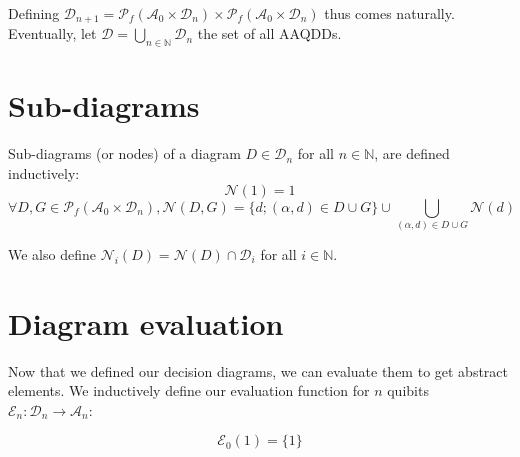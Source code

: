 \begin{center}
\end{center}

Defining $\mathcal{D}_{n+1} = \mathscr{P}_f(\mathcal{A}_0 \times \mathcal{D}_n) \times \mathscr{P}_f(\mathcal{A}_0 \times \mathcal{D}_n)$ thus comes naturally. Eventually, let $\mathcal{D} = \bigcup_{n \in \mathbb{N}} \mathcal{D}_n$ the set of all AAQDDs.

\section{Sub-diagrams}

Sub-diagrams (or nodes) of a diagram $D \in \mathcal{D}_n$ for all $n \in \mathbb{N}$, are defined inductively:
$$\mathcal{N}(\boxed{1}) = \boxed{1}$$
$$\forall D, G \in \mathscr{P}_f(\mathcal{A}_0 \times \mathcal{D}_n), \mathcal{N}(D, G) = \{d ; (\alpha, d) \in D \cup G\} \cup
\bigcup_{(\alpha, d) \in D \cup G} \mathcal{N}(d)$$

We also define $\mathcal{N}_i(D) = \mathcal{N}(D) \cap \mathcal{D}_i$ for all $i \in \mathbb{N}$.

\section{Diagram evaluation}

Now that we defined our decision diagrams, we can evaluate them to get abstract elements. We inductively define our evaluation function for $n$ quibits $\mathcal{E}_n : \mathcal{D}_n \rightarrow \mathcal{A}_n$:

$$\mathcal{E}_0(\boxed{1}) = \{1\}$$

